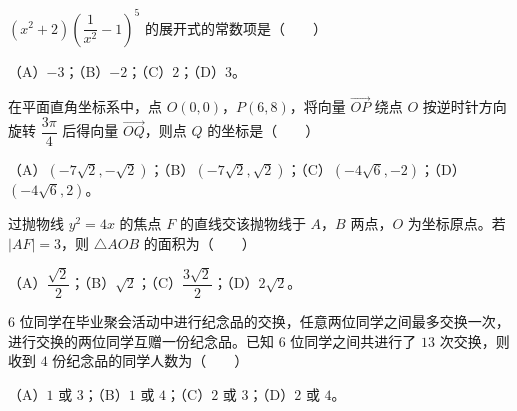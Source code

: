 \begin{question}
$\left(x^2+2\right)\left(\dfrac1{x^2}-1\right)^5$ 的展开式的常数项是\mbox{（　　）}

（A）$-3$；（B）$-2$；（C）$2$；（D）$3$。

\end{question}
\begin{question}
在平面直角坐标系中，点 $O(0,0)$，$P(6,8)$，将向量 $\overrightarrow{OP}$ 绕点 $O$ 按逆时针方向旋转 $\dfrac{3\pi}4$ 后得向量 $\overrightarrow{OQ}$，则点 $Q$ 的坐标是\mbox{（　　）}

（A）$\left(-7\sqrt2,-\sqrt2\right)$；（B）$\left(-7\sqrt2,\sqrt2\right)$；（C）$\left(-4\sqrt6,-2\right)$；（D）$\left(-4\sqrt6,2\right)$。

\end{question}
\begin{question}
过抛物线 $y^2=4x$ 的焦点 $F$ 的直线交该抛物线于 $A$，$B$ 两点，$O$ 为坐标原点。若 $|AF|=3$，则 $\triangle AOB$ 的面积为\mbox{（　　）}

（A）$\dfrac{\sqrt2}2$；（B）$\sqrt2$；（C）$\dfrac{3\sqrt2}2$；（D）$2\sqrt2$。

\end{question}
\begin{question}
$6$ 位同学在毕业聚会活动中进行纪念品的交换，任意两位同学之间最多交换一次，进行交换的两位同学互赠一份纪念品。已知 $6$ 位同学之间共进行了 $13$ 次交换，则收到 $4$ 份纪念品的同学人数为\mbox{（　　）}

（A）$1$ 或 $3$；（B）$1$ 或 $4$；（C）$2$ 或 $3$；（D）$2$ 或 $4$。

\end{question}


